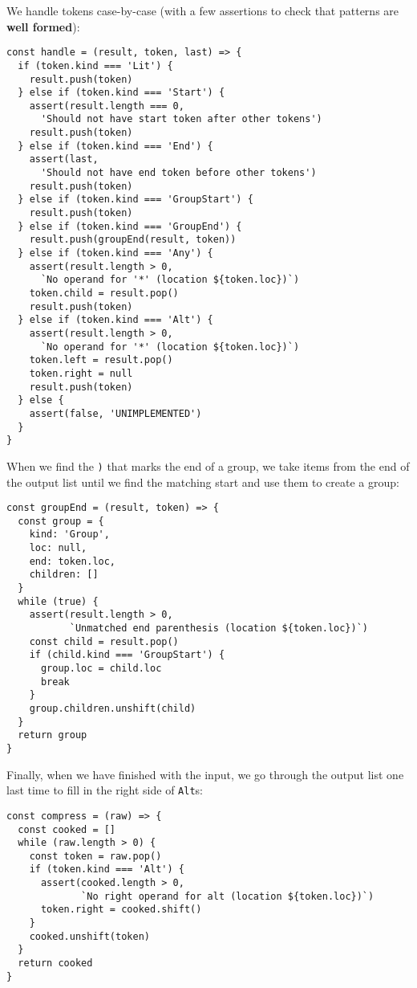 \documentclass[krantzl]{krantz}
\newcommand{\glossref}[1]{\textbf{#1}}
\begin{document}
We handle tokens case-by-case
(with a few assertions to check that patterns are \glossref{well formed}):


\begin{lstlisting}[frame=tblr]
const handle = (result, token, last) => {
  if (token.kind === 'Lit') {
    result.push(token)
  } else if (token.kind === 'Start') {
    assert(result.length === 0,
      'Should not have start token after other tokens')
    result.push(token)
  } else if (token.kind === 'End') {
    assert(last,
      'Should not have end token before other tokens')
    result.push(token)
  } else if (token.kind === 'GroupStart') {
    result.push(token)
  } else if (token.kind === 'GroupEnd') {
    result.push(groupEnd(result, token))
  } else if (token.kind === 'Any') {
    assert(result.length > 0,
      `No operand for '*' (location ${token.loc})`)
    token.child = result.pop()
    result.push(token)
  } else if (token.kind === 'Alt') {
    assert(result.length > 0,
      `No operand for '*' (location ${token.loc})`)
    token.left = result.pop()
    token.right = null
    result.push(token)
  } else {
    assert(false, 'UNIMPLEMENTED')
  }
}
\end{lstlisting}



When we find the \texttt{)} that marks the end of a group,
we take items from the end of the output list
until we find the matching start
and use them to create a group:


\begin{lstlisting}[frame=tblr]
const groupEnd = (result, token) => {
  const group = {
    kind: 'Group',
    loc: null,
    end: token.loc,
    children: []
  }
  while (true) {
    assert(result.length > 0,
           `Unmatched end parenthesis (location ${token.loc})`)
    const child = result.pop()
    if (child.kind === 'GroupStart') {
      group.loc = child.loc
      break
    }
    group.children.unshift(child)
  }
  return group
}
\end{lstlisting}



Finally,
when we have finished with the input,
we go through the output list one last time to fill in the right side of \texttt{Alt}s:


\begin{lstlisting}[frame=tblr]
const compress = (raw) => {
  const cooked = []
  while (raw.length > 0) {
    const token = raw.pop()
    if (token.kind === 'Alt') {
      assert(cooked.length > 0,
             `No right operand for alt (location ${token.loc})`)
      token.right = cooked.shift()
    }
    cooked.unshift(token)
  }
  return cooked
}
\end{lstlisting}
\end{document}
